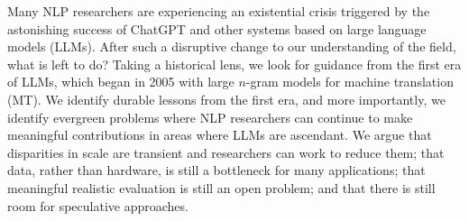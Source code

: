 Many NLP researchers are experiencing an existential crisis triggered by the astonishing success of ChatGPT and other systems based on large language models (LLMs). After such a disruptive change to our understanding of the field, what is left to do? Taking a historical lens, we look for guidance from the first era of LLMs, which began in 2005 with large $n$-gram models for machine translation (MT). We identify durable lessons from the first era, and more importantly, we identify evergreen problems where NLP researchers can continue to make meaningful contributions in areas where LLMs are ascendant. We argue that disparities in scale are transient and researchers can work to reduce them; that data, rather than hardware, is still a bottleneck for many applications; that meaningful realistic evaluation is still an open problem; and that there is still room for speculative approaches.